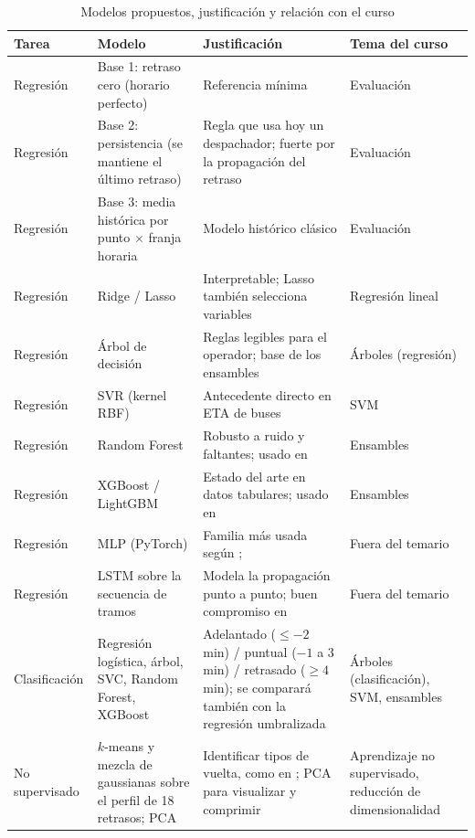 \documentclass[conference,spanish]{IEEEtran}
\begin{document}
\begin{table}[t]
\centering
\caption{Modelos propuestos, justificación y relación con el curso}
\label{tab:modelos}
\footnotesize
\begin{tabular}{@{}p{1.9cm}p{4.6cm}p{6.6cm}p{3.7cm}@{}}
\toprule
\textbf{Tarea} & \textbf{Modelo} & \textbf{Justificación} & \textbf{Tema del curso}\\
\midrule
Regresión & Base 1: retraso cero (horario perfecto) & Referencia mínima & Evaluación\\
Regresión & Base 2: persistencia (se mantiene el último retraso) & Regla que usa hoy un despachador; fuerte por la propagación del retraso & Evaluación\\
Regresión & Base 3: media histórica por punto $\times$ franja horaria & Modelo histórico clásico \cite{chien2002} & Evaluación\\
Regresión & Ridge / Lasso & Interpretable; Lasso también selecciona variables & Regresión lineal\\
Regresión & Árbol de decisión & Reglas legibles para el operador; base de los ensambles & Árboles (regresión)\\
Regresión & SVR (kernel RBF) & Antecedente directo en ETA de buses \cite{yu2006,yu2011} & SVM\\
Regresión & Random Forest \cite{breiman2001} & Robusto a ruido y faltantes; usado en \cite{martyanov2026} & Ensambles\\
Regresión & XGBoost \cite{chen2016} / LightGBM \cite{ke2017} & Estado del arte en datos tabulares; usado en \cite{martyanov2026,boudabbous2026} & Ensambles\\
Regresión & MLP (PyTorch) & Familia más usada según \cite{reich2019}; \cite{chien2002,jeong2004} & Fuera del temario\\
Regresión & LSTM \cite{hochreiter1997} sobre la secuencia de tramos & Modela la propagación punto a punto; buen compromiso en \cite{boudabbous2026} & Fuera del temario\\
Clasificación & Regresión logística, árbol, SVC, Random Forest, XGBoost & Adelantado ($\le-2$ min) / puntual ($-1$ a 3 min) / retrasado ($\ge4$ min); se comparará también con la regresión umbralizada & Árboles (clasificación), SVM, ensambles\\
No supervisado & $k$-means y mezcla de gaussianas sobre el perfil de 18 retrasos; PCA & Identificar tipos de vuelta, como en \cite{degeler2021}; PCA para visualizar y comprimir & Aprendizaje no supervisado, reducción de dimensionalidad\\
\bottomrule
\end{tabular}
\end{table}
\end{document}

